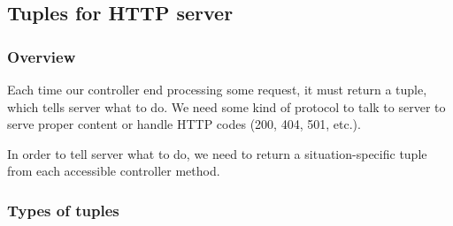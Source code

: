 \subsection{Tuples for HTTP server}
\subsubsection{Overview}Each time our controller end processing some request, it must return a tuple, which tells server what to do. We need some kind of protocol to talk to server to serve proper content or handle HTTP codes (200, 404, 501, etc.). 

In order to tell server what to do, we need to return a situation-specific tuple from each accessible controller method.
\subsubsection{Types of tuples}
